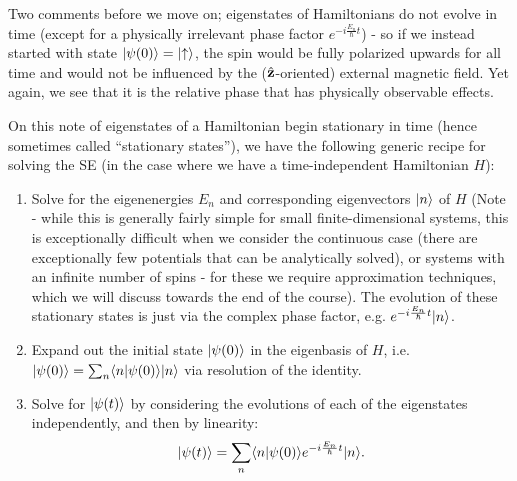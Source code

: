 Two comments before we move on; eigenstates of Hamiltonians do not evolve in time (except for a physically irrelevant phase factor $e^{-i\frac{E_n}{\hbar}t}$) - so if we instead started with state $\lvert \psi(0) \rangle = \lvert \uparrow \rangle$, the spin would be fully polarized upwards for all time and would not be influenced by the ($\hat{\mathbf{z}}$-oriented) external magnetic field. Yet again, we see that it is the relative phase that has physically observable effects.

On this note of eigenstates of a Hamiltonian begin stationary in time (hence sometimes called ``stationary states''), we have the following generic recipe for solving the SE (in the case where we have a time-independent Hamiltonian $H$):
\begin{enumerate}
    \item Solve for the eigenenergies $E_n$ and corresponding eigenvectors $\lvert n \rangle$ of $H$ (Note - while this is generally fairly simple for small finite-dimensional systems, this is exceptionally difficult when we consider the continuous case (there are exceptionally few potentials that can be analytically solved), or systems with an infinite number of spins - for these we require approximation techniques, which we will discuss towards the end of the course). The evolution of these stationary states is just via the complex phase factor, e.g. $e^{-i\frac{E_n}{\hbar}t}\lvert n \rangle$. 
    \item Expand out the initial state $\lvert \psi(0) \rangle$ in the eigenbasis of $H$, i.e. $\lvert \psi(0) \rangle = \sum_n \langle n \lvert \psi(0) \rangle\lvert n \rangle$ via resolution of the identity.
    \item Solve for $\lvert \psi(t) \rangle$ by considering the evolutions of each of the eigenstates independently, and then by linearity:
    \begin{equation}
        \lvert \psi(t) \rangle = \sum_n \langle n \lvert \psi(0) \rangle e^{-i\frac{E_n}{\hbar}t}\lvert n \rangle.
    \end{equation}
\end{enumerate}

